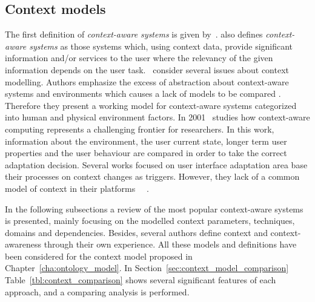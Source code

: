 \subsection{Context models}
\label{sec:context_models}

The first definition of \textit{context-aware systems} is given by~\citet{schilit_disseminating_1994}.
\citet{dey_understanding_2001} also defines \textit{context-aware systems} as
those systems which, using context data, provide significant information and/or
services to the user where the relevancy of the given information depends on the
user task.~\citet{schmidt_there_1999} consider several issues about context
modelling. Authors emphasize the excess of abstraction about context-aware systems
and environments which causes a lack of models to be compared . Therefore they
present a working model for context-aware systems categorized into human and
physical environment factors. In 2001~\citet{jameson_modelling_2001} studies how
context-aware computing represents a challenging frontier for researchers. In
this work, information about the environment, the user current state, longer
term user properties and the user behaviour are compared in order to take the
correct adaptation decision. Several works focused on user interface adaptation
area base their processes on context changes as triggers. However, they lack of
a common model of context in their platforms~\citep{calvary_plasticity_2002}
~\citep{nilsson_model_based_2006}.

In the following subsections a review of the most popular context-aware systems
is presented, mainly focusing on the modelled context parameters, techniques, 
domains and dependencies. Besides, several authors define context and 
context-awareness through their own experience. All these models and definitions 
have been considered for the context model proposed in 
Chapter~\ref{cha:ontology_model}. In Section~\ref{sec:context_model_comparison} 
Table~\ref{tbl:context_comparison} shows several significant features of each 
approach, and a comparing analysis is performed.















